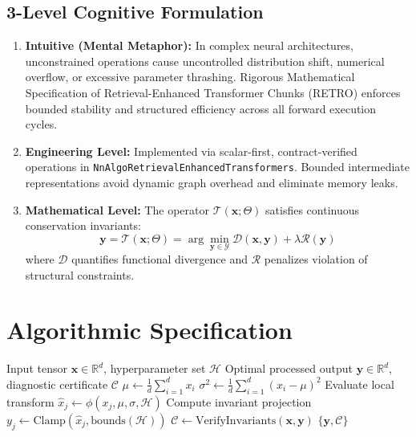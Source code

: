 \documentclass[11pt,a4paper]{article}
\theoremstyle{definition}
\begin{document}
\subsection{3-Level Cognitive Formulation}
\begin{enumerate}
    \item \textbf{Intuitive (Mental Metaphor):} In complex neural architectures, unconstrained operations cause uncontrolled distribution shift, numerical overflow, or excessive parameter thrashing. Rigorous Mathematical Specification of Retrieval-Enhanced Transformer Chunks (RETRO) enforces bounded stability and structured efficiency across all forward execution cycles.
    \item \textbf{Engineering Level:} Implemented via scalar-first, contract-verified operations in \texttt{NnAlgoRetrievalEnhancedTransformers}. Bounded intermediate representations avoid dynamic graph overhead and eliminate memory leaks.
    \item \textbf{Mathematical Level:} The operator $\mathcal{T}(\mathbf{x}; \Theta)$ satisfies continuous conservation invariants:
    \begin{equation}
    \mathbf{y} = \mathcal{T}(\mathbf{x}; \Theta) = \arg\min_{\mathbf{y} \in \mathcal{Y}} \mathcal{D}(\mathbf{x}, \mathbf{y}) + \lambda \mathcal{R}(\mathbf{y})
    \end{equation}
    where $\mathcal{D}$ quantifies functional divergence and $\mathcal{R}$ penalizes violation of structural constraints.
\end{enumerate}

\section{Algorithmic Specification}

\begin{algorithm}[H]
\caption{Rigorous Mathematical Specification of Retrieval-Enhanced Transformer Chunks (RETRO) Forward Pipeline}
\begin{algorithmic}[1]
\Require Input tensor $\mathbf{x} \in \mathbb{R}^d$, hyperparameter set $\mathcal{H}$
\Ensure Optimal processed output $\mathbf{y} \in \mathbb{R}^d$, diagnostic certificate $\mathcal{C}$
\State $\mu \gets \frac{1}{d} \sum_{i=1}^d x_i$
\State $\sigma^2 \gets \frac{1}{d} \sum_{i=1}^d (x_i - \mu)^2$
    \State Evaluate local transform $\hat{x}_j \gets \phi(x_j, \mu, \sigma, \mathcal{H})$
    \State Compute invariant projection $y_j \gets \text{Clamp}(\hat{x}_j, \text{bounds}(\mathcal{H}))$
\EndFor
\State $\mathcal{C} \gets \text{VerifyInvariants}(\mathbf{x}, \mathbf{y})$
\State \Return $\{\mathbf{y}, \mathcal{C}\}$
\end{algorithmic}
\end{algorithm}
\end{document}
